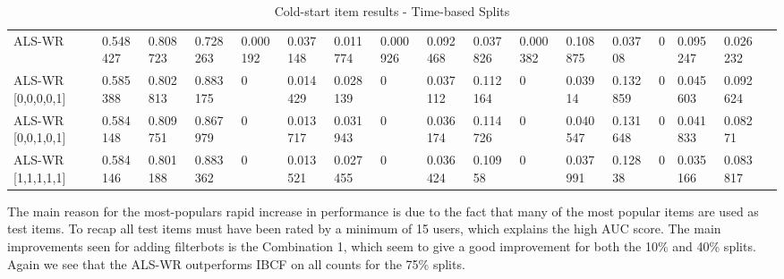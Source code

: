 \begin{table}[H]
{\begin{tabular}{*{17}{l}}
\rowcolor{Gray}
ALS-WR 			   & 0.548427&	0.808723&	0.728263&	0.000192&	0.037148&	0.011774&	0.000926&	0.092468&	0.037826&	0.000382&	0.108875&	0.03708	&	0	&	0.095247	&	0.026232	&	\\
ALS-WR [0,0,0,0,1] & 0.585388&	0.802813&	0.883175&	0		&	0.014429&	0.028139&	0		&	0.037112&	0.112164	&	0	&	0.03914	&	0.132859	&	0	&	0.045603	&	0.092624	& \\
ALS-WR [0,0,1,0,1] & 0.584148&	0.809751&	0.867979&	0		&	0.013717&	0.031943&	0		&	0.036174&	0.114726&	0	&	0.040547&	0.131648&	0	&	0.041833&	0.08271	& \\
ALS-WR [1,1,1,1,1] & 0.584146&	0.801188&	0.883362&	0		&	0.013521&	0.027455&	0		&	0.036424&	0.10958&	0&	0.037991&	0.12838	&	0	&	0.035166	&	0.083817	& \\

\bottomrule
\end{tabular}
}
\caption{Cold-start item results - Time-based Splits}
\end{table}

The main reason for the most-populars rapid increase in performance is due to the fact that many of the most popular items are used as test items.
To recap all test items must have been rated by a minimum of 15 users, which explains the high AUC score. The main improvements seen for adding filterbots
is the Combination 1, which seem to give a good improvement for both the 10\% and 40\% splits. Again we see that the ALS-WR outperforms IBCF
on all counts for the 75\% splits.


